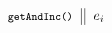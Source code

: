 \begin{figure}
\[{{\begin{array}{c}
\begin{tabular}{c || c}
   $\esc{getAndInc()}$ & ${\small{e_i}}$ 
\end{tabular}
\\\\[-5pt]

\end{array}}}\]
\end{figure}
